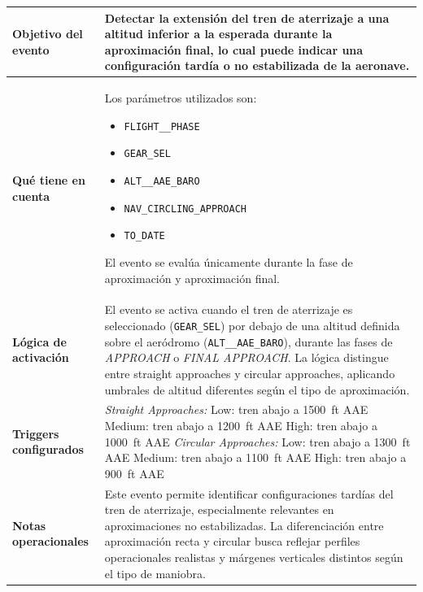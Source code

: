 \documentclass[11pt,a4paper]{article}
\begin{document}
	\begin{longtable}{p{5cm} p{9.5cm}}
		\hline
		\textbf{Objetivo del evento} &
		Detectar la extensión del tren de aterrizaje a una altitud inferior a la esperada durante la aproximación final, lo cual puede indicar una configuración tardía o no estabilizada de la aeronave. \\
		\hline
		\textbf{Qué tiene en cuenta} &
		Los parámetros utilizados son:
		\begin{itemize}
			\item \texttt{FLIGHT\_\_PHASE}
			\item \texttt{GEAR\_SEL}
			\item \texttt{ALT\_\_AAE\_BARO}
			\item \texttt{NAV\_CIRCLING\_APPROACH}
			\item \texttt{TO\_DATE}
		\end{itemize}
		El evento se evalúa únicamente durante la fase de aproximación y aproximación final. \\
		\hline
		\textbf{Lógica de activación} &
		El evento se activa cuando el tren de aterrizaje es seleccionado (\texttt{GEAR\_SEL}) por debajo de una altitud definida sobre el aeródromo (\texttt{ALT\_\_AAE\_BARO}), durante las fases de \textit{APPROACH} o \textit{FINAL APPROACH}.  
		La lógica distingue entre straight approaches y circular approaches, aplicando umbrales de altitud diferentes según el tipo de aproximación. \\
		\hline
		\textbf{Triggers configurados} &
		\textit{Straight Approaches:} \newline
		\quad Low: tren abajo a \SI{1500}{ft} AAE \newline
		\quad Medium: tren abajo a \SI{1200}{ft} AAE \newline
		\quad High: tren abajo a \SI{1000}{ft} AAE \newline
		\newline
		\textit{Circular Approaches:} \newline
		\quad Low: tren abajo a \SI{1300}{ft} AAE \newline
		\quad Medium: tren abajo a \SI{1100}{ft} AAE \newline
		\quad High: tren abajo a \SI{900}{ft} AAE \\
		\hline
		\textbf{Notas operacionales} &
		Este evento permite identificar configuraciones tardías del tren de aterrizaje, especialmente relevantes en aproximaciones no estabilizadas. La diferenciación entre aproximación recta y circular busca reflejar perfiles operacionales realistas y márgenes verticales distintos según el tipo de maniobra. \\
		\hline
	\end{longtable} \newpage
	
\end{document}

